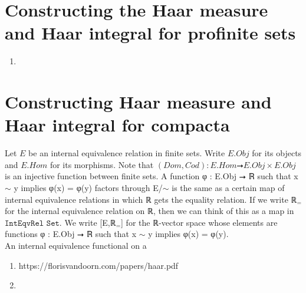 \documentclass[13pt]{amsart}
\begin{document}
\section{Constructing the Haar measure and Haar integral for profinite sets}


\begin{enumerate}
\item 
\end{enumerate}

\section{Constructing Haar measure and Haar integral for compacta}

Let $E$ be an internal equivalence relation in finite sets. Write $E.Obj$ for its objects and $E.Hom$ for its morphisms. Note that $(Dom,Cod): E.Hom ⭢ E.Obj \times E.Obj$ is an injective function between finite sets. A function φ : E.Obj ⭢ ℝ such that x $\sim$ y implies φ(x) = φ(y) factors through E/$\sim$ is the same as a certain map of internal equivalence relations in which ℝ gets the equality relation. If we write ℝ${}_{=}$ for the internal equivalence relation on ℝ, then we can think of this as a map in $\texttt{IntEqvRel Set}$. We write [E,ℝ${}_{=}$] for the ℝ-vector space whose elements are functions φ : E.Obj ⭢ ℝ such that x $\sim$ y implies φ(x) = φ(y).\\

An internal equivalence functional on a 


\begin{enumerate}
\item https://florisvandoorn.com/papers/haar.pdf
\item 
\end{enumerate}
\end{document}
